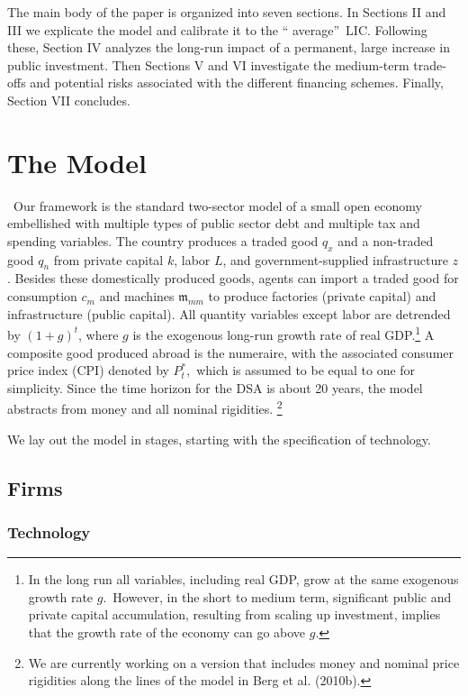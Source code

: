 \documentclass[11pt]{article}
\begin{document}
The main body of the paper is organized into seven sections. In Sections II
and III we explicate the model and calibrate it to the \textquotedblleft
average\textquotedblright\ LIC. Following these, Section IV analyzes the
long-run impact of a permanent, large increase in public investment. Then
Sections V and VI investigate the medium-term trade-offs and potential risks
associated with the different financing schemes. Finally, Section VII
concludes.

\section{The Model}

\quad\ \thinspace Our framework is the standard two-sector model of a small
open economy embellished with multiple types of public sector debt and
multiple tax and spending variables. The country produces a traded good $%
q_{x}$ and a non-traded good $q_{n}$ from private capital $k$, labor $L$,
and government-supplied infrastructure $z$. Besides these domestically
produced goods, agents can import a traded good for consumption $c_{m}$ and
machines $\mathfrak{m}_{mm}$ to produce factories (private capital) and
infrastructure (public capital). All quantity variables except labor are
detrended by $(1+g)^{t}$, where $g$ is the exogenous long-run growth rate of
real GDP.\footnote{%
In the long run all variables, including real GDP, grow at the same
exogenous growth rate $g.$\ However, in the short to medium term,
significant public and private capital accumulation, resulting from scaling
up investment, implies that the growth rate of the economy can go above $g.$}
A composite good produced abroad is the numeraire, with the associated
consumer price index (CPI) denoted by $P_{t}^{\ast },$ which is assumed to
be equal to one for simplicity. Since the time horizon for the DSA is about
20 years, the model abstracts from money and all nominal rigidities.%
\footnote{%
We are currently working on a version that includes money and nominal price
rigidities along the lines of the model in Berg et al. (2010b).}

We lay out the model in stages, starting with the specification of
technology.

\subsection{Firms}

\subsubsection{Technology}
\end{document}
